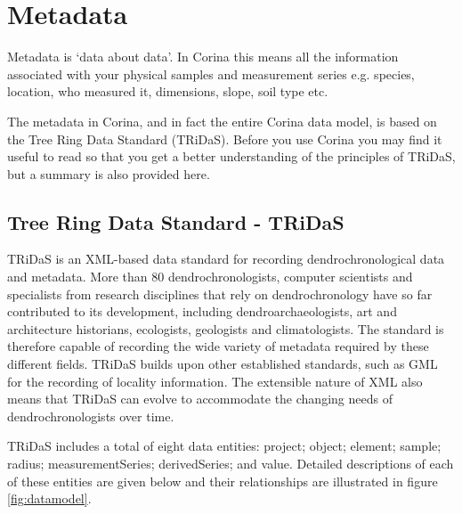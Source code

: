 \chapter{Metadata}
\label{txt:metadata}

Metadata is `data about data'. In Corina this means all the information associated with your physical samples and measurement series e.g. species, location, who measured it, dimensions, slope, soil type etc.

The metadata in Corina, and in fact the entire Corina data model, is based on the Tree Ring Data Standard (TRiDaS). Before you use Corina you may find it useful to read \citet{tridas} so that you get a better understanding of the principles of TRiDaS, but a summary is also provided here.

\section{Tree Ring Data Standard - TRiDaS}

TRiDaS is an XML-based data standard for recording dendrochronological data and metadata. More than 80 dendrochronologists, computer scientists and specialists from research disciplines that rely on dendrochronology have so far contributed to its development, including dendroarchaeologists, art and architecture historians, ecologists, geologists and climatologists.  The standard is therefore capable of recording the wide variety of metadata required by these different fields. TRiDaS builds upon other established standards, such as GML for the recording of locality information.  The extensible nature of XML also means that TRiDaS can evolve to accommodate the changing needs of dendrochronologists over time.  

TRiDaS includes a total of eight data entities: project; object; element; sample; radius; measurementSeries; derivedSeries; and value.  Detailed descriptions of each of these entities are given below and their relationships are illustrated in figure \ref{fig:datamodel}.


